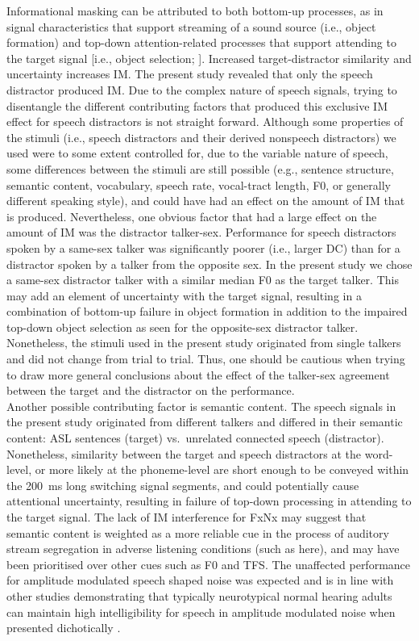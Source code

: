 \documentclass[a4paper, twoside]{templates/ociamthesis}
\begin{document}
Informational masking can be attributed to both bottom-up processes, as in signal characteristics that support streaming of a sound source (i.e., object formation) and top-down attention-related processes that support attending to the target signal {[}i.e., object selection; \textcite{Shinn-Cunningham2008}{]}. Increased target-distractor similarity and uncertainty increases IM. The present study revealed that only the speech distractor produced IM. Due to the complex nature of speech signals, trying to disentangle the different contributing factors that produced this exclusive IM effect for speech distractors is not straight forward. Although some properties of the stimuli (i.e., speech distractors and their derived nonspeech distractors) we used were to some extent controlled for, due to the variable nature of speech, some differences between the stimuli are still possible (e.g., sentence structure, semantic content, vocabulary, speech rate, vocal-tract length, F0, or generally different speaking style), and could have had an effect on the amount of IM that is produced. Nevertheless, one obvious factor that had a large effect on the amount of IM was the distractor talker-sex. Performance for speech distractors spoken by a same-sex talker was significantly poorer (i.e., larger DC) than for a distractor spoken by a talker from the opposite sex. In the present study we chose a same-sex distractor talker with a similar median F0 as the target talker. This may add an element of uncertainty with the target signal, resulting in a combination of bottom-up failure in object formation in addition to the impaired top-down object selection as seen for the opposite-sex distractor talker. Nonetheless, the stimuli used in the present study originated from single talkers and did not change from trial to trial. Thus, one should be cautious when trying to draw more general conclusions about the effect of the talker-sex agreement between the target and the distractor on the performance.\\

Another possible contributing factor is semantic content. The speech signals in the present study originated from different talkers and differed in their semantic content: ASL sentences (target) vs.~unrelated connected speech (distractor). Nonetheless, similarity between the target and speech distractors at the word-level, or more likely at the phoneme-level are short enough to be conveyed within the 200~ms long switching signal segments, and could potentially cause attentional uncertainty, resulting in failure of top-down processing in attending to the target signal. The lack of IM interference for FxNx may suggest that semantic content is weighted as a more reliable cue in the process of auditory stream segregation in adverse listening conditions (such as here), and may have been prioritised over other cues such as F0 and TFS. The unaffected performance for amplitude modulated speech shaped noise was expected and is in line with other studies demonstrating that typically neurotypical normal hearing adults can maintain high intelligibility for speech in amplitude modulated noise when presented dichotically \autocite[e.g.,][]{Brungart2013}.\\
\end{document}
